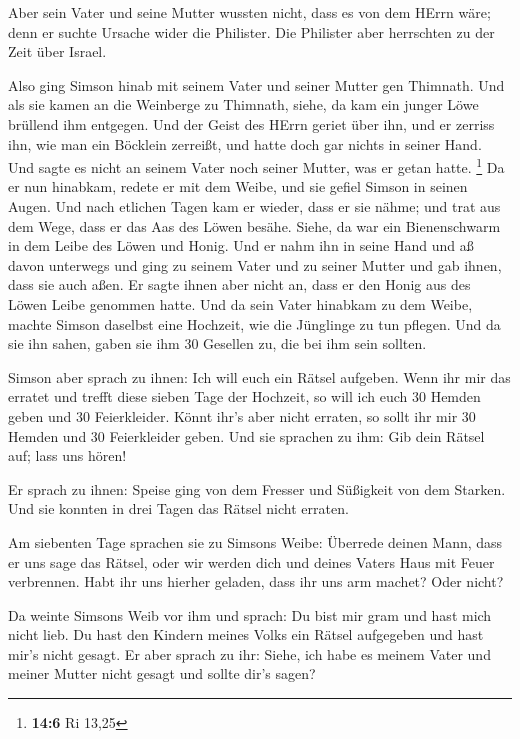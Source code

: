  Aber sein Vater und seine Mutter wussten nicht, dass es
von dem HErrn wäre; denn er suchte Ursache wider die Philister. Die
Philister aber herrschten zu der Zeit über Israel.

 Also ging Simson hinab mit seinem Vater und seiner Mutter
gen Thimnath. Und als sie kamen an die Weinberge zu Thimnath, siehe, da
kam ein junger Löwe brüllend ihm entgegen.  Und der Geist
des HErrn geriet über ihn, und er zerriss ihn, wie man ein Böcklein
zerreißt, und hatte doch gar nichts in seiner Hand. Und sagte es nicht
an seinem Vater noch seiner Mutter, was er getan hatte. \footnote{\textbf{14:6}
  Ri 13,25}  Da er nun hinabkam, redete er mit dem Weibe,
und sie gefiel Simson in seinen Augen.  Und nach etlichen
Tagen kam er wieder, dass er sie nähme; und trat aus dem Wege, dass er
das Aas des Löwen besähe. Siehe, da war ein Bienenschwarm in dem Leibe
des Löwen und Honig.  Und er nahm ihn in seine Hand und aß
davon unterwegs und ging zu seinem Vater und zu seiner Mutter und gab
ihnen, dass sie auch aßen. Er sagte ihnen aber nicht an, dass er den
Honig aus des Löwen Leibe genommen hatte.  Und da sein
Vater hinabkam zu dem Weibe, machte Simson daselbst eine Hochzeit, wie
die Jünglinge zu tun pflegen.  Und da sie ihn sahen,
gaben sie ihm 30 Gesellen zu, die bei ihm sein sollten.

 Simson aber sprach zu ihnen: Ich will euch ein Rätsel
aufgeben. Wenn ihr mir das erratet und trefft diese sieben Tage der
Hochzeit, so will ich euch 30 Hemden geben und 30 Feierkleider.
 Könnt ihr's aber nicht erraten, so sollt ihr mir 30
Hemden und 30 Feierkleider geben. Und sie sprachen zu ihm: Gib dein
Rätsel auf; lass uns hören!

 Er sprach zu ihnen: Speise ging von dem Fresser und
Süßigkeit von dem Starken. Und sie konnten in drei Tagen das Rätsel
nicht erraten.

 Am siebenten Tage sprachen sie zu Simsons Weibe:
Überrede deinen Mann, dass er uns sage das Rätsel, oder wir werden dich
und deines Vaters Haus mit Feuer verbrennen. Habt ihr uns hierher
geladen, dass ihr uns arm machet? Oder nicht?

 Da weinte Simsons Weib vor ihm und sprach: Du bist mir
gram und hast mich nicht lieb. Du hast den Kindern meines Volks ein
Rätsel aufgegeben und hast mir's nicht gesagt. Er aber sprach zu ihr:
Siehe, ich habe es meinem Vater und meiner Mutter nicht gesagt und
sollte dir's sagen?

